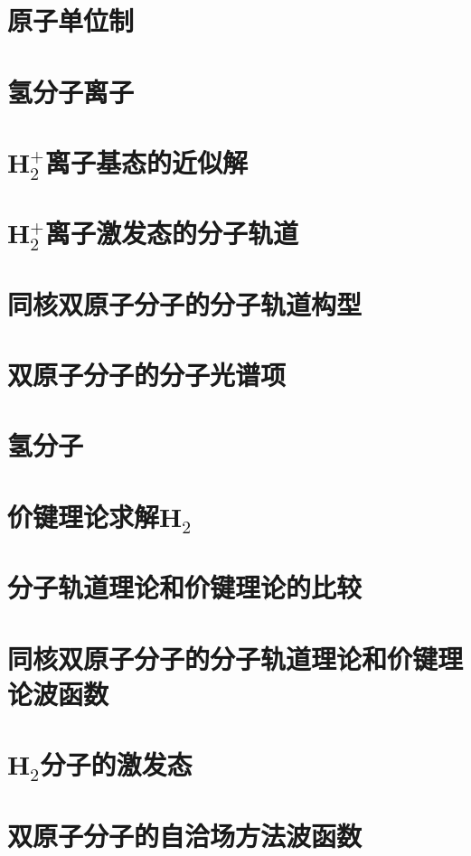 \documentclass{book}
\begin{document}
	\section{原子单位制}
	
	\section{氢分子离子}
	
	\section{H$_2^+$离子基态的近似解}
	
	\section{H$_2^+$离子激发态的分子轨道}
	
	\section{同核双原子分子的分子轨道构型}
	
	\section{双原子分子的分子光谱项}
	
	\section{氢分子}
	
	\section{价键理论求解H$_2$}
	
	\section{分子轨道理论和价键理论的比较}
	
	\section{同核双原子分子的分子轨道理论和价键理论波函数}
	
	\section{H$_2$分子的激发态}
	
	\section{双原子分子的自洽场方法波函数}
	
\end{document}
